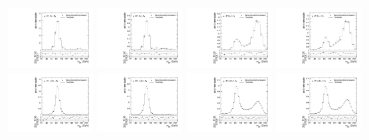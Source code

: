 \begin{figure}[htbp]
  \centering
  \includegraphics[width=0.2\textwidth]{fig/2Dfit/templateVsReco_res_r0_MJ_mu_HP_bb_LDy.pdf}
  \includegraphics[width=0.2\textwidth]{fig/2Dfit/templateVsReco_res_r0_MJ_e_HP_bb_LDy.pdf}
  \includegraphics[width=0.2\textwidth]{fig/2Dfit/templateVsReco_res_r0_MJ_mu_LP_bb_LDy.pdf}
  \includegraphics[width=0.2\textwidth]{fig/2Dfit/templateVsReco_res_r0_MJ_e_LP_bb_LDy.pdf}\\
  \includegraphics[width=0.2\textwidth]{fig/2Dfit/templateVsReco_res_r0_MJ_mu_HP_nobb_LDy.pdf}
  \includegraphics[width=0.2\textwidth]{fig/2Dfit/templateVsReco_res_r0_MJ_e_HP_nobb_LDy.pdf}
  \includegraphics[width=0.2\textwidth]{fig/2Dfit/templateVsReco_res_r0_MJ_mu_LP_nobb_LDy.pdf}
  \includegraphics[width=0.2\textwidth]{fig/2Dfit/templateVsReco_res_r0_MJ_e_LP_nobb_LDy.pdf}\\

\end{figure}
